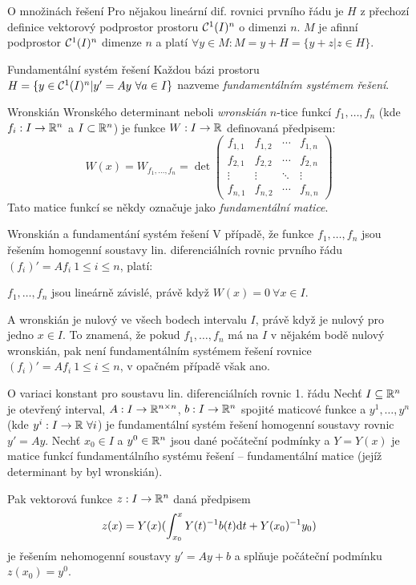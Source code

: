 \begin{vetaN}{O množinách řešení}
Pro nějakou lineární dif. rovnici prvního řádu je $H$ z přechozí definice vektorový podprostor prostoru $\mathcal{C}^1(I)^n$ o dimenzi $n$. $M$ je afinní podprostor $\mathcal{C}^1(I)^n$ dimenze $n$ a platí $\forall y\in M: M=y+H=\{y+z|z\in H\}$.
\end{vetaN}

\begin{definiceN}{Fundamentální systém řešení}
Každou bázi prostoru $H=\{y\in\mathcal{C}^1(I)^n| y'=Ay\ \forall a\in I\}$ nazveme \emph{fundamentálním systémem řešení}.
\end{definiceN}

\begin{definiceN}{Wronskián}
Wronského determinant neboli \emph{wronskián} $n$-tice funkcí $f_1,\dots,f_n$ (kde $f_i:I\to\mathbb{R}^n$ a $I\subset\mathbb{R}^n$) je funkce $W:I\to\mathbb{R}$ definovaná předpisem:
$$W(x)=W_{f_1,\dots,f_n}=\det\left(\begin{matrix}
f_{1,1} & f_{1,2} & \cdots & f_{1,n} \\
f_{2,1} & f_{2,2} & \cdots & f_{2,n} \\
\vdots & \vdots & \ddots & \vdots \\
f_{n,1} & f_{n,2} & \cdots & f_{n,n}
\end{matrix}\right)$$
Tato matice funkcí se někdy označuje jako \emph{fundamentální matice}.
\end{definiceN}

\begin{vetaN}{Wronskián a fundamentání systém řešení}
V případě, že funkce $f_1,\dots,f_n$ jsou řešením homogenní soustavy lin. diferenciálních rovnic prvního řádu $(f_i)'=Af_i\ 1\leq i\leq n$, platí:
\begin{center}
$f_1,\dots,f_n$ jsou lineárně závislé, právě když $W(x)=0\ \forall x\in I$.
\end{center}
A wronskián je nulový ve všech bodech intervalu $I$, právě když je nulový pro jedno $x\in I$. To znamená, že pokud $f_1,\dots,f_n$ má na $I$ v nějakém bodě nulový wronskián, pak není fundamentálním systémem řešení rovnice $(f_i)'=Af_i\ 1\leq i\leq n$, v opačném případě však ano.
\end{vetaN}

\begin{vetaN}{O variaci konstant pro soustavu lin. diferenciálních rovnic 1. řádu}
Nechť $I\subseteq\mathbb{R}^n$ je otevřený interval, $A:I\to\mathbb{R}^{n\times n}$, $b:I\to\mathbb{R}^n$ spojité maticové funkce a $y^1,\dots,y^n$ (kde $y^i:I\to\mathbb{R}\ \forall i$) je fundamentální systém řešení homogenní soustavy rovnic $y'=Ay$. Nechť $x_0\in I$ a $y^0\in\mathbb{R}^n$ jsou dané počáteční podmínky a $Y=Y(x)$ je matice funkcí fundamentálního systému řešení -- fundamentální matice (jejíž determinant by byl wronskián).

Pak vektorová funkce $z:I\to\mathbb{R}^n$ daná předpisem 
$$z(x)=Y(x)(\int_{x_0}^x Y(t)^{-1}b(t)\mathrm{d} t + Y(x_0)^{-1}y_0)$$
je řešením nehomogenní soustavy $y'=Ay+b$ a splňuje počáteční podmínku $z(x_0)=y^0$.
\end{vetaN}

